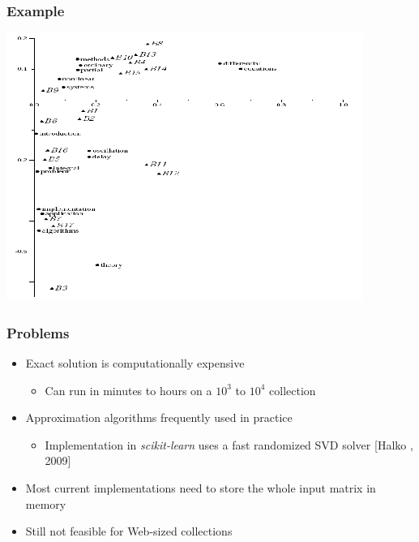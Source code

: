 \documentclass{beamer}
\begin{document}

\begin{frame}
  \frametitle{Example}

  \centering
  \includegraphics[width=\linewidth]{lsi2}

\end{frame}


\begin{frame} 
  \frametitle{Problems}
  
  \begin{itemize}
  \item Exact solution is computationally expensive
    \begin{itemize}
    \item Can run in minutes to hours on a $10^3$ to $10^4$ collection
    \end{itemize}
  \item Approximation algorithms frequently used in practice
    \begin{itemize}
    \item Implementation in {\it scikit-learn} uses a fast randomized SVD solver [Halko , 2009]
    \end{itemize}  
  \item Most current implementations need to store the whole input matrix in memory
  \item Still not feasible for Web-sized collections
  \end{itemize}

\end{frame}


\end{document}
